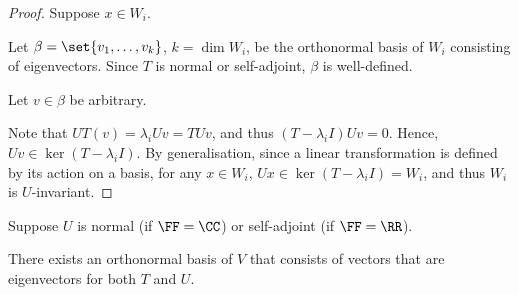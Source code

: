 \documentclass[11pt]{scrartcl}
\begin{document}
\begin{proof}
  \hfill

  Suppose $x\in W_i$.

  Let $\beta = \set{v_1,\dots, v_k}$, $k=\dim W_i$, be the orthonormal
  basis of $W_i$ consisting of eigenvectors. Since $T$ is normal or
  self-adjoint, $\beta$ is well-defined.

  Let $v\in \beta$ be arbitrary.


  Note that $UT(v) = \lambda_i Uv = TUv$, and thus
  $(T-\lambda_iI)Uv = 0$. Hence, $Uv \in \ker (T-\lambda_iI)$. By generalisation, since a linear
  transformation is defined by its action on a basis, for any
  $x\in W_i$, $Ux \in \ker (T-\lambda_iI) = W_i$, and thus $W_i$ is
  $U$-invariant.
\end{proof}

\begin{lemma}

  Suppose $U$ is normal (if $\FF =\CC$) or self-adjoint (if $\FF = \RR$).

  There exists an orthonormal basis of $V$ that consists of vectors
  that are eigenvectors for both $T$ and $U$.

\end{lemma}
\end{document}
